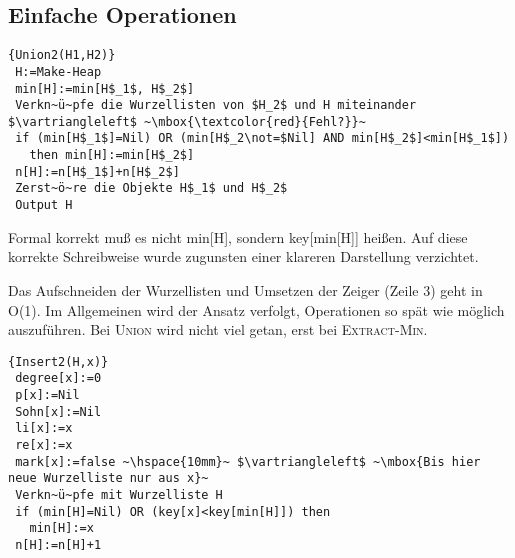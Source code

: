 \documentclass[ngerman,draft,parskip=half*,twoside]{scrreprt}
\theoremstyle{break}
\begin{document}
\subsection{Einfache Operationen}
\begin{Algorithmus}[H]
\begin{lstlisting}[frame=tlrb, mathescape=true, title=\textsc{Union\textnormal{(H$_1$, H$_2$)}},gobble=1]{Union2(H1,H2)}
 H:=Make-Heap
 min[H]:=min[H$_1$, H$_2$]
 Verkn~ü~pfe die Wurzellisten von $H_2$ und H miteinander $\vartriangleleft$ ~\mbox{\textcolor{red}{Fehl?}}~
 if (min[H$_1$]=Nil) OR (min[H$_2\not=$Nil] AND min[H$_2$]<min[H$_1$])
   then min[H]:=min[H$_2$]
 n[H]:=n[H$_1$]+n[H$_2$]
 Zerst~ö~re die Objekte H$_1$ und H$_2$
 Output H     
\end{lstlisting}
Formal korrekt muß es nicht min[H], sondern key[min[H]] heißen. Auf diese korrekte Schreibweise wurde
zugunsten einer klareren Darstellung verzichtet.
\end{Algorithmus}
Das Aufschneiden der Wurzellisten und Umsetzen der Zeiger (Zeile 3) geht in O(1). Im Allgemeinen wird der Ansatz
verfolgt, Operationen so spät wie möglich auszuführen. Bei \textsc{Union} wird nicht viel getan, erst bei
\textsc{Extract-Min}.

\begin{Algorithmus}[H]
\begin{lstlisting}[frame=tlrb, mathescape=true, title=\textsc{Insert\textnormal{(H, x)}}, gobble=1]{Insert2(H,x)}
 degree[x]:=0
 p[x]:=Nil
 Sohn[x]:=Nil
 li[x]:=x
 re[x]:=x
 mark[x]:=false ~\hspace{10mm}~ $\vartriangleleft$ ~\mbox{Bis hier neue Wurzelliste nur aus x}~
 Verkn~ü~pfe mit Wurzelliste H
 if (min[H]=Nil) OR (key[x]<key[min[H]]) then
   min[H]:=x
 n[H]:=n[H]+1   
\end{lstlisting}
\end{Algorithmus}
\end{document}
